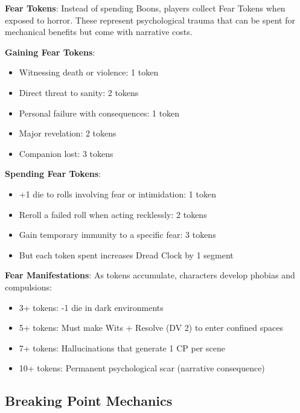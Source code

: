 \documentclass[11pt]{article}
\begin{document}
\begin{mdframed}[backgroundcolor=sanitybg]
\textbf{Fear Tokens}: Instead of spending Boons, players collect Fear Tokens when exposed to horror. These represent psychological trauma that can be spent for mechanical benefits but come with narrative costs.

\textbf{Gaining Fear Tokens}:
\begin{itemize}[leftmargin=*]
\item Witnessing death or violence: 1 token
\item Direct threat to sanity: 2 tokens
\item Personal failure with consequences: 1 token
\item Major revelation: 2 tokens
\item Companion lost: 3 tokens
\end{itemize}

\textbf{Spending Fear Tokens}:
\begin{itemize}[leftmargin=*]
\item +1 die to rolls involving fear or intimidation: 1 token
\item Reroll a failed roll when acting recklessly: 2 tokens
\item Gain temporary immunity to a specific fear: 3 tokens
\item But each token spent increases Dread Clock by 1 segment
\end{itemize}

\textbf{Fear Manifestations}: As tokens accumulate, characters develop phobias and compulsions:
\begin{itemize}[leftmargin=*]
\item 3+ tokens: -1 die in dark environments
\item 5+ tokens: Must make Wits + Resolve (DV 2) to enter confined spaces
\item 7+ tokens: Hallucinations that generate 1 CP per scene
\item 10+ tokens: Permanent psychological scar (narrative consequence)
\end{itemize}
\end{mdframed}

\subsection*{Breaking Point Mechanics}
\end{document}
